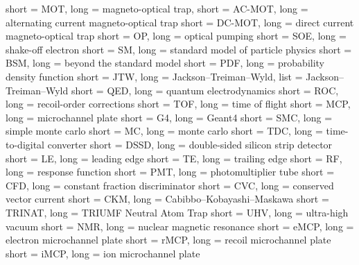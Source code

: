 % 
% 
% 

{
	short = MOT,
	long = magneto-optical trap,
}
{
	short = AC-MOT,
	long = alternating current magneto-optical trap
}
{
	short = DC-MOT,
	long = direct current magneto-optical trap
}
{
	short = OP,
	long = optical pumping
}
{
	short = SOE,
	long = shake-off electron
}
{
	short = SM,
	long = standard model of particle physics
}
{
	short = BSM,
	long = beyond the standard model
}
{
	short = PDF,
	long = probability density function
}
{
	short = JTW,
	long = Jackson--Treiman--Wyld,
	list = Jackson--Treiman--Wyld \cite{jtw}\cite{jtw_coulomb}
}
{
	short = QED,
	long = quantum electrodynamics
}
{
	short = ROC,
	long = recoil-order corrections
}
{
	short = TOF,
	long = time of flight
}
{
	short = MCP,
	long = microchannel plate
}
{
	short = G4,
	long = Geant4
}
{
	short = SMC,
	long = simple monte carlo
}
{
	short = MC,
	long = monte carlo
}
{
	short = TDC,
	long = time-to-digital converter
}
{
	short = DSSD,
	long = double-sided silicon strip detector
}
{
	short = LE,
	long = leading edge
}
{
	short = TE,
	long = trailing edge
}
{
	short = RF,
	long = response function
}
{
	short = PMT,
	long = photomultiplier tube
}
{
	short = CFD,
	long = constant fraction discriminator
}
{
	short = CVC,
	long = conserved vector current
}
{
	short = CKM,
	long = Cabibbo--Kobayashi--Maskawa
}
{
	short = TRINAT,
	long = TRIUMF Neutral Atom Trap
}
{
	short = UHV,
	long = ultra-high vacuum
}
{
	short = NMR,
	long = nuclear magnetic resonance
}
{
	short = eMCP,
	long = electron microchannel plate
}
{
	short = rMCP,
	long = recoil microchannel plate
}
{
	short = iMCP,
	long = ion microchannel plate
}













